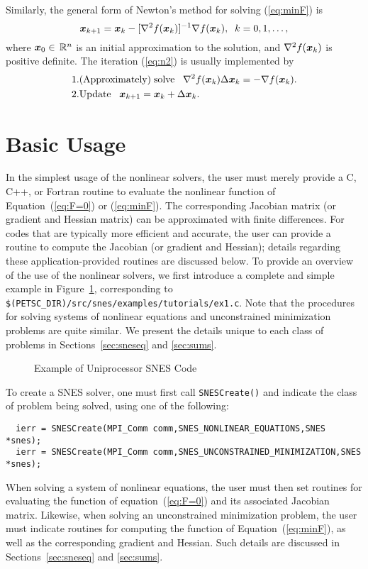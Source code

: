 Similarly, the general form of Newton's method for solving (\ref{eq:minF}) is
\begin{equation}
    \mbox{\boldmath \(x\)}_{k+1} = \mbox{\boldmath \(x\)}_k - [ \nabla^2 f(\mbox{\boldmath \(x\)}_k)]^{-1} \nabla f(\mbox{\boldmath \(x\)}_k), \;\;
          k=0,1, \ldots,
\label{eq:n2}
\end{equation}
where $\mbox{\boldmath \(x\)}_0 \in \, \mathbb R^n$ is an initial approximation
to the solution, and $\nabla^2 f(\mbox{\boldmath \(x\)}_k)$ is positive definite.
The iteration (\ref{eq:n2}) is usually implemented by
\begin{eqnarray}
  1. & {\rm (Approximately) \;solve\;\;\;} \nabla^2 f(\mbox{\boldmath \(x\)}_k) \Delta \mbox{\boldmath \(x\)}_k = -\nabla f(\mbox{\boldmath \(x\)}_k).\\
  2. & {\rm Update\;\;\;} \mbox{\boldmath \(x\)}_{k+1} = \mbox{\boldmath \(x\)}_k + \Delta \mbox{\boldmath \(x\)}_k. \hspace{.325in}
\end{eqnarray}

\section{Basic Usage}
\label{sec:snesusage}

In the simplest usage of the nonlinear solvers, the user must merely 
provide a C, C++, or Fortran routine to evaluate the nonlinear function 
of Equation~(\ref{eq:F=0}) or (\ref{eq:minF}).
The corresponding Jacobian  matrix 
(or gradient  and Hessian  matrix) 
can be approximated with finite differences.
For codes that are typically more efficient and accurate, the
user can provide a routine to compute the Jacobian (or gradient 
and Hessian); details regarding these application-provided 
routines are discussed below.  
To provide an overview of the use of the nonlinear solvers,
we first introduce a complete and simple example in
Figure~\ref{fig:snesexample}, corresponding to 
{\tt \$(PETSC\_DIR)/src/snes/examples/tutorials/ex1.c}.  
Note that the procedures for solving systems
of nonlinear equations and unconstrained minimization problems
are quite similar.  We present the details unique to each class of 
problems in Sections~\ref{sec:sneseq} and \ref{sec:sums}.

\begin{figure}[H]
{\small
{}
}
\caption{Example of Uniprocessor SNES Code}
\label{fig:snesexample}
\end{figure}

To create a SNES solver, one must first call {\tt SNESCreate()} and indicate
the class of problem being solved, using one of the following:
\begin{verbatim}
  ierr = SNESCreate(MPI_Comm comm,SNES_NONLINEAR_EQUATIONS,SNES *snes);
  ierr = SNESCreate(MPI_Comm comm,SNES_UNCONSTRAINED_MINIMIZATION,SNES *snes);
\end{verbatim}
When solving a system of nonlinear equations, the user must then set
routines for evaluating the function of equation~(\ref{eq:F=0}) and its
associated Jacobian matrix.  Likewise, when solving an unconstrained
minimization problem, the user must indicate routines for computing
the function of Equation~(\ref{eq:minF}), as well as the corresponding
gradient and Hessian. Such details are discussed in 
Sections~\ref{sec:sneseq} and \ref{sec:sums}.

